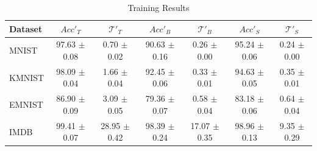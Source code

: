 \begin{table}
\caption{Training Results}
\label{tab:train-table-dkd}
\begin{tabular}{|l|c|c|c|c|c|c|}
\hline
Dataset & $Acc'_T$ & $\mathcal{T}'_T$ & $Acc'_B$ & $\mathcal{T}'_B$ & $Acc'_S$ & $\mathcal{T}'_S$ \\
\hline
MNIST & 97.63 \newline $\pm$ 0.08 & 0.70 \newline $\pm$ 0.02 & 90.63 \newline $\pm$ 0.16 & 0.26 \newline $\pm$ 0.00 & 95.24 \newline $\pm$ 0.06 & 0.24 \newline $\pm$ 0.00 \\\hline
KMNIST & 98.09 \newline $\pm$ 0.04 & 1.66 \newline $\pm$ 0.04 & 92.45 \newline $\pm$ 0.06 & 0.33 \newline $\pm$ 0.01 & 94.63 \newline $\pm$ 0.05 & 0.35 \newline $\pm$ 0.01 \\\hline
EMNIST & 86.90 \newline $\pm$ 0.09 & 3.09 \newline $\pm$ 0.05 & 79.36 \newline $\pm$ 0.07 & 0.58 \newline $\pm$ 0.04 & 83.18 \newline $\pm$ 0.06 & 0.64 \newline $\pm$ 0.04 \\\hline
IMDB & 99.41 \newline $\pm$ 0.07 & 28.95 \newline $\pm$ 0.42 & 98.39 \newline $\pm$ 0.24 & 17.07 \newline $\pm$ 0.35 & 98.96 \newline $\pm$ 0.13 & 9.35 \newline $\pm$ 0.29 \\\hline
\end{tabular}
\end{table}